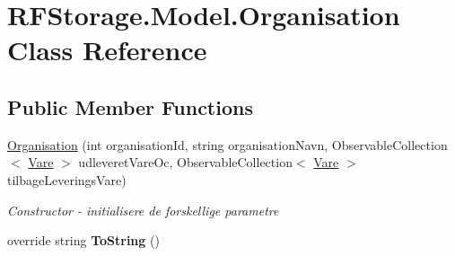 \hypertarget{class_r_f_storage_1_1_model_1_1_organisation}{}\section{R\+F\+Storage.\+Model.\+Organisation Class Reference}
\label{class_r_f_storage_1_1_model_1_1_organisation}
\subsection*{Public Member Functions}
\begin{DoxyCompactItemize}
\item 
\mbox{\hyperlink{class_r_f_storage_1_1_model_1_1_organisation_a9f0e6dcfbdbda6037a2da66d69149cd8}{Organisation}} (int organisation\+Id, string organisation\+Navn, Observable\+Collection$<$ \mbox{\hyperlink{class_r_f_storage_1_1_model_1_1_vare}{Vare}} $>$ udleveret\+Vare\+Oc, Observable\+Collection$<$ \mbox{\hyperlink{class_r_f_storage_1_1_model_1_1_vare}{Vare}} $>$ tilbage\+Leverings\+Vare)
\begin{DoxyCompactList}\small\item\em Constructor -\/ initialisere de forskellige parametre \end{DoxyCompactList}\item 
\mbox{\label{class_r_f_storage_1_1_model_1_1_organisation_a15a36ebc7f2554f3a2a7d20154282ba9}} 
override string {\bfseries To\+String} ()
\end{DoxyCompactItemize}
